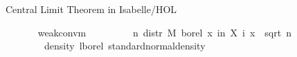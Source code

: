 \documentclass[usepdftitle=false]{beamer}
\begin{document}
\begin{frame}{Central Limit Theorem in Isabelle/HOL}
\begin{isabellebody}
\ \ \isanewline
\ \ \ \ {\isachardoublequoteopen}weak{\isacharunderscore}conv{\isacharunderscore}m\ \isanewline
\ \ \ \ \ \ \ \ {\isacharparenleft}{\isasymlambda}n{\isachardot}\ distr\ M\ borel\ {\isacharparenleft}{\isasymlambda}x{\isachardot}\ {\isasymSum}i{\isacharless}n{\isachardot}\ X\ i\ x\ {\isacharslash}\ sqrt\ {\isacharparenleft}n\ {\isacharasterisk}\ {\isasymsigma}\isanewline
\ \ \ \ \ \ \ \ {\isacharparenleft}density\ lborel\ standard{\isacharunderscore}normal{\isacharunderscore}density{\isacharparenright}{\isachardoublequoteclose}
\end{isabellebody}

\end{frame}

\begin{frame}

\end{frame}
\end{document}
